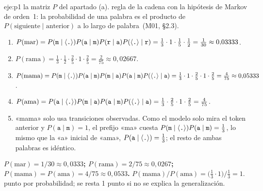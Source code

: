 \begin{solucion}{eje:p1}
\datos la matriz $P$ del apartado (a).
\planteamiento regla de la cadena con la hipótesis de Markov de orden~1: la probabilidad de una palabra es el producto de $P(\text{siguiente}\mid\text{anterior})$ a lo largo de \fin palabra\fin\ (M01, §2.3).
\pasos
\begin{enumerate}[label=\arabic*.]
  \item $P(\text{mar})=P(\texttt m\mid\langle\texttt{.}\rangle)P(\texttt a\mid\texttt m)P(\texttt r\mid\texttt a)P(\langle\texttt{.}\rangle\mid\texttt r)=\tfrac13\cdot1\cdot\tfrac15\cdot\tfrac12=\tfrac1{30}\approx 0{,}03333$.
  \item $P(\text{rama})=\tfrac13\cdot\tfrac12\cdot\tfrac25\cdot1\cdot\tfrac25=\tfrac{2}{75}\approx 0{,}02667$.
  \item $P(\text{mama})=P(\texttt m\mid\langle\texttt{.}\rangle)P(\texttt a\mid\texttt m)P(\texttt m\mid\texttt a)P(\texttt a\mid\texttt m)P(\langle\texttt{.}\rangle\mid\texttt a)=\tfrac13\cdot1\cdot\tfrac25\cdot1\cdot\tfrac25=\tfrac{4}{75}\approx 0{,}05333$.
  \item $P(\text{ama})=P(\texttt a\mid\langle\texttt{.}\rangle)P(\texttt m\mid\texttt a)P(\texttt a\mid\texttt m)P(\langle\texttt{.}\rangle\mid\texttt a)=\tfrac13\cdot\tfrac25\cdot1\cdot\tfrac25=\tfrac{4}{75}$.
  \item «mama» solo usa transiciones observadas. Como el modelo solo mira el token anterior y $P(\texttt a\mid\texttt m)=1$, el prefijo «ma» cuesta $P(\texttt m\mid\langle\texttt{.}\rangle)P(\texttt a\mid\texttt m)=\tfrac13$, lo mismo que la «a» inicial de «ama», $P(\texttt a\mid\langle\texttt{.}\rangle)=\tfrac13$; el resto de ambas palabras es idéntico.
\end{enumerate}
\resultado \textbf{$P(\text{mar})=1/30\approx 0{,}0333$; $P(\text{rama})=2/75\approx 0{,}0267$; $P(\text{mama})=P(\text{ama})=4/75\approx 0{,}0533$.}
\comprobacion $P(\text{mama})/P(\text{ama})=\big(\tfrac13\cdot 1\big)/\tfrac13=1$.
 punto por probabilidad; se resta 1 punto si no se explica la generalización.


\end{solucion}
